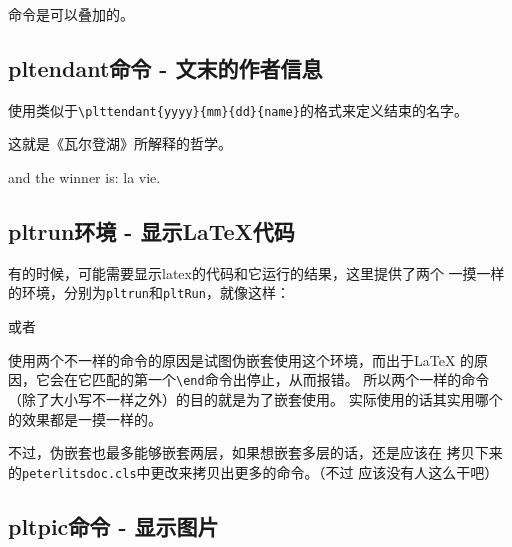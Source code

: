 \documentclass{peterlitsdoc}
\newcommand{\vb}{\verb}
\begin{document}
命令是可以叠加的。
\begin{pltrun}
\end{pltrun}


\subsection{pltendant命令 - 文末的作者信息}

使用类似于\vb|\plttendant{yyyy}{mm}{dd}{name}|的格式来定义结束的名字。
\begin{pltrun}
这就是《瓦尔登湖》所解释的哲学。

and the winner is: la vie.

\end{pltrun}


\subsection{pltrun环境 - 显示\LaTeX{}代码}

有的时候，可能需要显示latex的代码和它运行的结果，这里提供了两个
一摸一样的环境，分别为\vb|pltrun|和\verb|pltRun|，就像这样：
\begin{pltRun}
\begin{pltrun}
\end{pltrun}
\end{pltRun}
或者
\begin{pltrun}
\begin{pltRun}
\end{pltRun}
\end{pltrun}

使用两个不一样的命令的原因是试图伪嵌套使用这个环境，而出于\LaTeX
的原因，它会在它匹配的第一个\vb|\end|命令出停止，从而报错。
所以两个一样的命令（除了大小写不一样之外）的目的就是为了嵌套使用。
实际使用的话其实用哪个的效果都是一摸一样的。

不过，伪嵌套也最多能够嵌套两层，如果想嵌套多层的话，还是应该在
拷贝下来的\vb|peterlitsdoc.cls|中更改来拷贝出更多的命令。（不过
应该没有人这么干吧）


\subsection{pltpic命令 - 显示图片}
\end{document}
